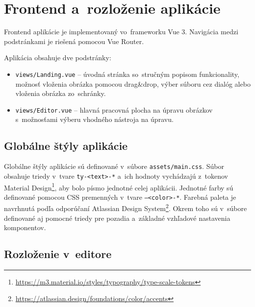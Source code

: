 \section{Frontend a~rozloženie aplikácie}

Frontend aplikácie je implementovaný vo~frameworku Vue 3. Navigácia medzi podstránkami je riešená pomocou Vue Router.

Aplikácia obsahuje dve podstránky:
\begin{itemize}
    \item \texttt{views/Landing.vue} -- úvodná stránka so~stručným popisom funkcionality, možnosť vloženia obrázka pomocou drag\&drop, výber súboru cez dialóg alebo vloženia obrázka zo~schránky.
    \item \texttt{views/Editor.vue} -- hlavná pracovná plocha na úpravu obrázkov s~možnosťami výberu vhodného nástroja na úpravu.
\end{itemize}

\subsection{Globálne štýly aplikácie}

Globálne štýly aplikácie sú definované v~súbore \texttt{assets/main.css}. Súbor obsahuje triedy v~tvare \texttt{ty-<text>-*} a~ich hodnoty vychádzajú z~tokenov Material Design\footnote{\url{https://m3.material.io/styles/typography/type-scale-tokens}}, aby bolo písmo jednotné celej aplikácii. Jednotné farby sú definované pomocou CSS premenných v~tvare \texttt{--<color>-*}. Farebná paleta je navrhnutá podľa odporúčaní Atlassian Design System\footnote{\url{https://atlassian.design/foundations/color/accents}}. Okrem toho sú v~súbore definované aj pomocné triedy pre pozadia a~základné vzhľadové nastavenia komponentov.

\subsection{Rozloženie v~editore}

